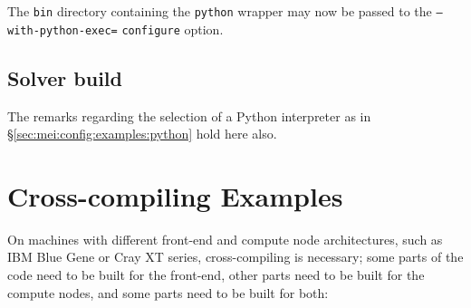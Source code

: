 \documentclass[a4paper,10pt,twoside]{article}
\begin{document}
The \texttt{bin} directory containing the \texttt{python} wrapper
may now be passed to the \texttt{--with-python-exec=}
\texttt{configure} option.

\subsection{Solver build\label{sec:ncs:config:examples}}


The remarks regarding the selection of a Python interpreter
as in \S\ref{sec:mei:config:examples:python} hold here also.

\section{Cross-compiling Examples}

On machines with different front-end and compute node architectures,
such as IBM Blue Gene or Cray XT series, cross-compiling is necessary;
some parts of the code need to be built for the front-end, other parts need
to be built for the compute nodes, and some parts need to be built for both:
\end{document}
